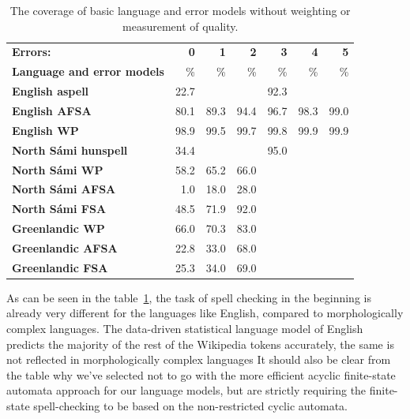 \documentclass[a4paper,12pt]{article}
\begin{document}
\begin{table}
    \centering
    \begin{tabular}{|l|r|r|r|r|r|r|}
        \hline
        \bf Errors: & \bf 0  & \bf 1 & \bf 2 & \bf 3 & \bf 4 & \bf 5 \\
        \bf Language and error models &  \% & \% & \% & \% & \% & \% \\
        \hline
        \bf English aspell & 22.7 & \multicolumn{5}{|c|}{92.3}  \\
        \bf English AFSA   & 80.1 & 89.3 & 94.4 & 96.7 & 98.3 & 99.0 \\
            \bf English WP & 98.9 & 99.5 & 99.7 & 99.8 & 99.9 & 99.9 \\
        \hline
        \bf North Sámi hunspell & 34.4 & \multicolumn{5}{|c|}{95.0} \\
        \bf North Sámi WP & 58.2 & 65.2 & 66.0 & & & \\
               \bf North Sámi AFSA & 1.0 & 18.0 & 28.0 & & & \\
               \bf North Sámi FSA & 48.5 & 71.9 & 92.0 & & & \\
        \hline
        \bf Greenlandic WP            & 66.0 & 70.3 & 83.0 & & & \\
                 \bf Greenlandic AFSA & 22.8 & 33.0 & 68.0 & & & \\
                  \bf Greenlandic FSA & 25.3 & 34.0 & 69.0 & & & \\
        \hline
    \end{tabular}
    \caption{The coverage of basic language and error models without weighting
        or measurement of quality.\label{table:coverage}}
\end{table}

As can be seen in the table~\ref{table:coverage}, the task of spell
checking in the beginning is already very different for the languages like
English, compared to morphologically complex languages. The data-driven
statistical language model of English predicts the majority of the rest of the
Wikipedia tokens accurately, the same is not reflected in morphologically
complex languages It should also be clear from the table why we've selected not
to go with the more efficient acyclic finite-state automata approach for our
language models, but are strictly requiring the finite-state spell-checking to
be based on the non-restricted cyclic automata.
\end{document}
